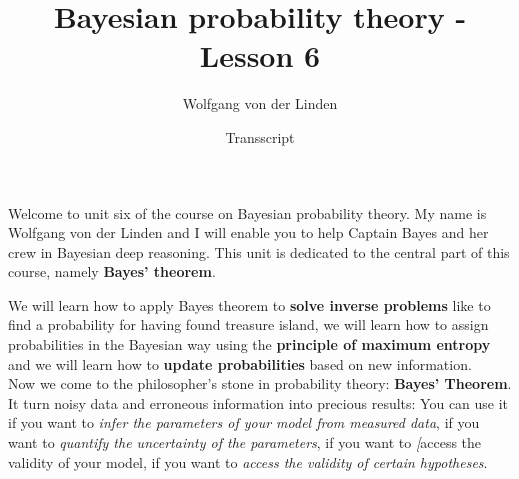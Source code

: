 \documentclass[12pt, a4paper]{scrartcl}
\title{Bayesian probability theory - Lesson 6}
\author{Wolfgang von der Linden}
\date{Transscript}
\begin{document}
\setlength{\parindent}{0pt}
\maketitle
\onehalfspacing
Welcome to unit six of the course on Bayesian probability theory. 
My name is Wolfgang von der Linden and I will enable you to help 
Captain Bayes and her crew in Bayesian deep reasoning.
This unit is dedicated to the central part of this course, namely \textbf{Bayes’ theorem}.

We will learn how to apply Bayes theorem to \textbf{solve inverse problems}
like to ﬁnd a probability for having found treasure island,
we will learn how to assign probabilities in the Bayesian way using the
\textbf{principle of maximum entropy}
and we will learn how to \textbf{update probabilities} based on new information.\\

Now we come to the philosopher’s stone in probability theory: \textbf{Bayes’ Theorem}.
It turn noisy data and erroneous information into precious results: You can
use it
if you want to \textit{infer the parameters of your model from measured data},
if you want to \textit{quantify the uncertainty of the parameters},
if you want to \textit[{access the validity of your model},
if you want to \textit{access the validity of certain hypotheses}.\\
\end{document}
